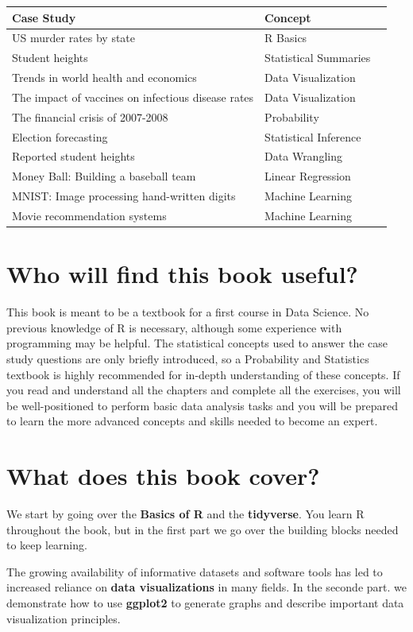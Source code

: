 \documentclass[openany]{book}
\begin{document}
\begin{longtable}[]{@{}lll@{}}
\toprule
Case Study & Concept &\tabularnewline
\midrule
\endhead
US murder rates by state & R Basics &\tabularnewline
Student heights & Statistical Summaries &\tabularnewline
Trends in world health and economics & Data Visualization &\tabularnewline
The impact of vaccines on infectious disease rates & Data Visualization &\tabularnewline
The financial crisis of 2007-2008 & Probability &\tabularnewline
Election forecasting & Statistical Inference &\tabularnewline
Reported student heights & Data Wrangling &\tabularnewline
Money Ball: Building a baseball team & Linear Regression &\tabularnewline
MNIST: Image processing hand-written digits & Machine Learning &\tabularnewline
Movie recommendation systems & Machine Learning &\tabularnewline
\bottomrule
\end{longtable}

\hypertarget{who-will-find-this-book-useful}{%
\section*{Who will find this book useful?}\label{who-will-find-this-book-useful}}


This book is meant to be a textbook for a first course in Data Science. No previous knowledge of R is necessary, although some experience with programming may be helpful. The statistical concepts used to answer the case study questions are only briefly introduced, so a Probability and Statistics textbook is highly recommended for in-depth understanding of these concepts. If you read and understand all the chapters and complete all the exercises, you will be well-positioned to perform basic data analysis tasks and you will be prepared to learn the more advanced concepts and skills needed to become an expert.

\hypertarget{what-does-this-book-cover}{%
\section*{What does this book cover?}\label{what-does-this-book-cover}}


We start by going over the \textbf{Basics of R} and the \textbf{tidyverse}. You learn R throughout the book, but in the first part we go over the building blocks needed to keep learning.

The growing availability of informative datasets and software tools has led to increased reliance on \textbf{data visualizations} in many fields. In the seconde part. we demonstrate how to use \textbf{ggplot2} to generate graphs and describe important data visualization principles.
\end{document}
